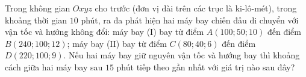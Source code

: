 \begin{ex}
Trong không gian $Oxyz$ cho trước (đơn vị dài trên các trục là ki-lô-mét), trong khoảng thời gian $10$ phút, ra đa phát hiện hai máy bay chiến đấu di chuyển với vận tốc và hướng không đổi: máy bay (I) bay từ điểm $A(100;50;10)$ đến điểm $B(240;100;12)$; máy bay (II) bay từ điểm $C(80;40;6)$ đến điểm $D(220;100;9)$. Nếu hai máy bay giữ nguyên vận tốc và hướng bay thì khoảng cách giữa hai máy bay sau $15$ phút tiếp theo gần nhất với giá trị nào sau đây?
\end{ex}
